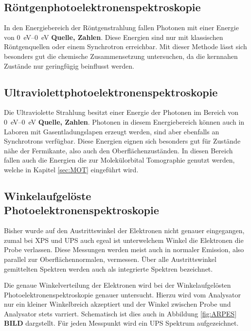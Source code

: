     \subsection{Röntgenphotoelektronenspektroskopie}
        In den Energiebereich der Röntgenstrahlung fallen Photonen mit einer Energie von \SIrange{0}{0}{\electronvolt} \textbf{Quelle, Zahlen}.
        Diese Energien sind nur mit klassischen Röntgenquellen oder einem Synchrotron erreichbar.
        Mit dieser Methode lässt sich besonders gut die chemische Zusammensetzung untersuchen, da die kernnahen Zustände nur geringfügig beinflusst werden.

    \subsection{Ultraviolettphotoelektronenspektroskopie}
        Die Ultraviolette Strahlung besitzt einer Energie der Photonen im Bereich von \SIrange{0}{0}{\electronvolt} \textbf{Quelle, Zahlen}.
        Photonen in diesem Energiebereich können auch in Laboren mit Gasentladungslapen erzeugt werden, sind aber ebenfalls an Synchrotrons verfügbar.
        Diese Energien eignen sich besonders gut für Zustände nähe der Fermikante, also auch den Oberflächenzuständen.
        In diesen Bereich fallen auch die Energien die zur Molekülorbital Tomographie genutzt werden, welche in Kapitel \ref{sec:MOT} eingeführt wird.

    \subsection{Winkelaufgelöste Photoelektronenspektroskopie}
        Bisher wurde  auf den Austrittswinkel der Elektronen nicht genauer eingegangen, zumal bei XPS und UPS auch egeal ist unterwelchem Winkel die Elektronen die Probe verlassen.
        Diese Messungen werden meist auch in normaler Emission, also parallel zur Oberflächennormalen, vermessen.
        Über alle Austrittswinkel gemittelten Spektren werden auch als integrierte Spektren bezeichnet.

        Die genaue Winkelverteilung der Elektronen wird bei der Winkelaufgelösten Photoelektronenspektroskopie genauer untersucht.
        Hierzu wird vom Analysator nur ein kleiner Winkelbreich akzeptiert und der Winkel zwischen Probe und Analysator stets varriert.
        Schematisch ist dies auch in Abbildung \ref{fig:ARPES} \textbf{BILD} dargstellt.
        Für jeden Messpunkt wird ein UPS Spektrum aufgezeichnet.


